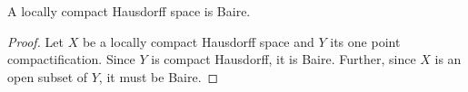 \begin{corollary}
    A locally compact Hausdorff space is Baire.
\end{corollary}
\begin{proof}
    Let $X$ be a locally compact Hausdorff space and $Y$ its one point compactification. Since $Y$ is compact Hausdorff, it is Baire. Further, since $X$ is an open subset of $Y$, it must be Baire.
\end{proof}